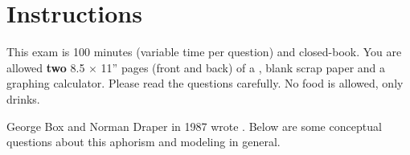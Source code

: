 \documentclass[12pt,landscape]{article}
\begin{document}
\section*{Instructions}
This exam is 100 minutes (variable time per question) and closed-book. You are allowed \textbf{two} 8.5 $\times$ 11'' pages (front and back) of a , blank scrap paper and a graphing calculator. Please read the questions carefully. No food is allowed, only drinks. %

\pagebreak

\problem{} George Box and Norman Draper in 1987 wrote . Below are some conceptual questions about this aphorism and modeling in general.

\vspace{-0.2cm}\benum{} 
\end{document}
